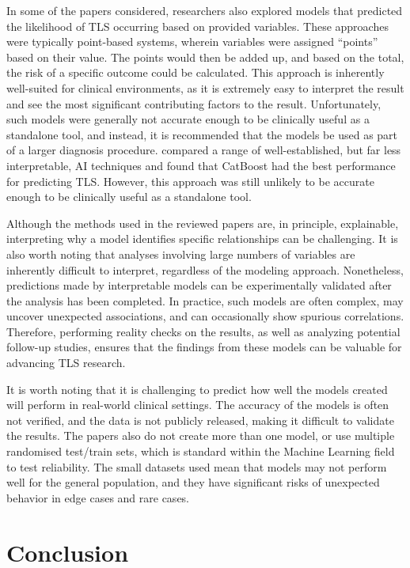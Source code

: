 \documentclass{article}
\begin{document}
In some of the papers considered, researchers also explored models that predicted the likelihood of TLS occurring based on provided variables. These approaches were typically point-based systems, wherein variables were assigned “points” based on their value. The points would then be added up, and based on the total, the risk of a specific outcome could be calculated. This approach is inherently well-suited for clinical environments, as it is extremely easy to interpret the result and see the most significant contributing factors to the result. Unfortunately, such models were generally not accurate enough to be clinically useful as a standalone tool, and instead, it is recommended that the models be used as part of a larger diagnosis procedure. \cite{xiao2024prediction}  compared a range of well-established, but far less interpretable, AI techniques and found that CatBoost had the best performance for predicting TLS. However, this approach was still unlikely to be accurate enough to be clinically useful as a standalone tool.

Although the methods used in the reviewed papers are, in principle, explainable, interpreting why a model identifies specific relationships can be challenging.  It is also worth noting that analyses involving large numbers of variables are inherently difficult to interpret, regardless of the modeling approach. Nonetheless, predictions made by interpretable models can be experimentally validated after the analysis has been completed.  In practice, such models are often complex, may uncover unexpected associations, and can occasionally show spurious correlations. Therefore, performing reality checks on the results, as well as analyzing potential follow-up studies, ensures that the findings from these models can be valuable for advancing TLS research.

It is worth noting that it is challenging to predict how well the models created will perform in real-world clinical settings. The accuracy of the models is often not verified, and the data is not publicly released, making it difficult to validate the results. The papers also do not create more than one model, or use multiple randomised test/train sets, which is standard within the Machine Learning field to test reliability. The small datasets used mean that models may not perform well for the general population, and they have significant risks of unexpected behavior in edge cases and rare cases.

\section{Conclusion}
\end{document}
